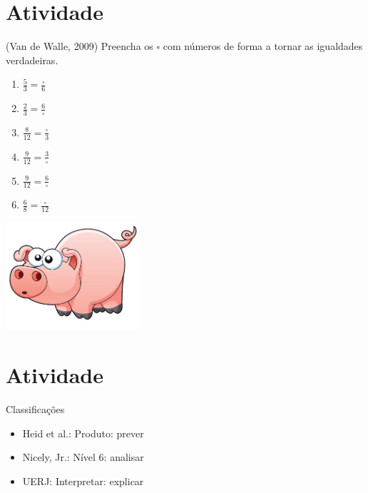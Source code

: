 \documentclass[a4,12pt]{book}
\begin{document}
\section{Atividade}







(Van de Walle, 2009)
Preencha os $\square$ com números de forma a tornar as igualdades verdadeiras.

\begin{enumerate} [\quad a)] %
  \item         $\frac{5}{3} = \frac{\square}{6}$
  \item         $\frac{2}{3} = \frac{6}{\square}$
  \item         $\frac{8}{12} = \frac{\square}{3}$
  \item         $\frac{9}{12} = \frac{3}{\square}$
  \item         $\frac{9}{12} = \frac{6}{\square}$
  \item         $\frac{6}{8} = \frac{\square}{12}$
\end{enumerate} %






\includegraphics[width=\textwidth,height=4cm, keepaspectratio]{pig}
\section{Atividade}






Classificações
\begin{itemize} %
  \item     Heid et al.: Produto: prever
  \item     Nicely, Jr.: Nível 6: analisar
  \item     UERJ: Interpretar: explicar
\end{itemize} %
\end{document}
